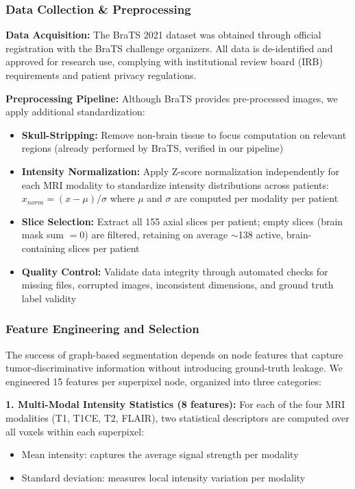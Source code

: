\documentclass{article}
\begin{document}
\subsubsection{Data Collection \& Preprocessing}

\textbf{Data Acquisition:} The BraTS 2021 dataset was obtained through official registration with the BraTS challenge organizers. All data is de-identified and approved for research use, complying with institutional review board (IRB) requirements and patient privacy regulations.

\textbf{Preprocessing Pipeline:} Although BraTS provides pre-processed images, we apply additional standardization:

\begin{itemize}
    \item \textbf{Skull-Stripping:} Remove non-brain tissue to focus computation on relevant regions (already performed by BraTS, verified in our pipeline)
    
    \item \textbf{Intensity Normalization:} Apply Z-score normalization independently for each MRI modality to standardize intensity distributions across patients: $x_{norm} = (x - \mu) / \sigma$ where $\mu$ and $\sigma$ are computed per modality per patient
    
    \item \textbf{Slice Selection:} Extract all 155 axial slices per patient; empty slices (brain mask sum $= 0$) are filtered, retaining on average $\sim$138 active, brain-containing slices per patient
    
    \item \textbf{Quality Control:} Validate data integrity through automated checks for missing files, corrupted images, inconsistent dimensions, and ground truth label validity
\end{itemize}

\subsubsection{Feature Engineering and Selection}

The success of graph-based segmentation depends on node features that capture tumor-discriminative information without introducing ground-truth leakage. We engineered 15 features per superpixel node, organized into three categories:

\textbf{1. Multi-Modal Intensity Statistics (8 features):} For each of the four MRI modalities (T1, T1CE, T2, FLAIR), two statistical descriptors are computed over all voxels within each superpixel:
\begin{itemize}
    \item Mean intensity: captures the average signal strength per modality
    \item Standard deviation: measures local intensity variation per modality
\end{itemize}
\end{document}
